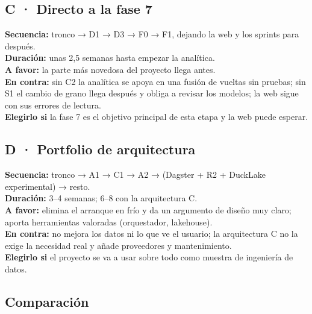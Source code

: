 \documentclass[11pt,openany]{report}
\begin{document}
\subsection*{C · Directo a la fase 7}
\textbf{Secuencia:} tronco → D1 → D3 → F0 → F1, dejando la web y los sprints para después.\\
\textbf{Duración:} unas 2,5 semanas hasta empezar la analítica.\\
\textbf{A favor:} la parte más novedosa del proyecto llega antes.\\
\textbf{En contra:} sin C2 la analítica se apoya en una fusión de vueltas sin pruebas; sin S1 el
cambio de grano llega después y obliga a revisar los modelos; la web sigue con sus errores de
lectura.\\
\textbf{Elegirlo si} la fase 7 es el objetivo principal de esta etapa y la web puede esperar.

\subsection*{D · Portfolio de arquitectura}
\textbf{Secuencia:} tronco → A1 → C1 → A2 → (Dagster + R2 + DuckLake experimental) → resto.\\
\textbf{Duración:} 3–4 semanas; 6–8 con la arquitectura C.\\
\textbf{A favor:} elimina el arranque en frío y da un argumento de diseño muy claro; aporta
herramientas valoradas (orquestador, lakehouse).\\
\textbf{En contra:} no mejora los datos ni lo que ve el usuario; la arquitectura C no la exige la
necesidad real y añade proveedores y mantenimiento.\\
\textbf{Elegirlo si} el proyecto se va a usar sobre todo como muestra de ingeniería de datos.

\subsection*{Comparación}
\end{document}
